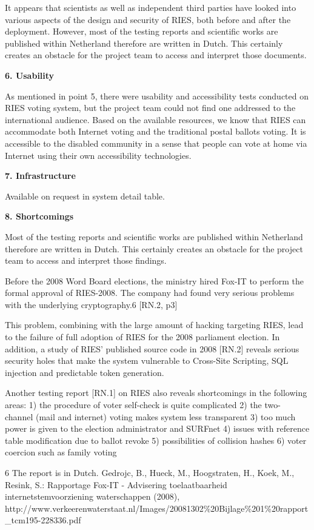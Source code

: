 It appears that scientists as well as independent third parties have looked into various aspects of the design and security of RIES, both before and after the deployment. However, most of the testing reports and scientific works are published within Netherland therefore are written in Dutch. This certainly creates an obstacle for the project team to access and interpret those documents.

\textbf{6. Usability}

As mentioned in point 5, there were usability and accessibility tests conducted on RIES voting system, but the project team could not find one addressed to the international audience. Based on the available resources, we know that RIES can accommodate both Internet voting and the traditional postal ballots voting. It is accessible to the disabled community in a sense that people can vote at home via Internet using their own accessibility technologies.

\textbf{7. Infrastructure}

Available on request in system detail table.

\textbf{8. Shortcomings}

Most of the testing reports and scientific works are published within Netherland therefore are written in Dutch. This certainly creates an obstacle for the project team to access and interpret those findings.

Before the 2008 Word Board elections, the ministry hired Fox-IT to perform the formal approval of RIES-2008. The company had found very serious problems with the underlying cryptography.6 [RN.2, p3]

This problem, combining with the large amount of hacking targeting RIES, lead to the failure of full adoption of RIES for the 2008 parliament election. In addition, a study of RIES' published source code in 2008 [RN.2] reveals serious security holes that make the system vulnerable to Cross-Site Scripting, SQL injection and predictable token generation.

Another testing report [RN.1] on RIES also reveals shortcomings in the following areas: 1) the procedure of voter self-check is quite complicated 2) the two- channel (mail and internet) voting makes system less transparent 3) too much power is given to the election administrator and SURFnet 4) issues with reference table modification due to ballot revoke 5) possibilities of collision hashes 6) voter coercion such as family voting

6 The report is in Dutch. Gedrojc, B., Hueck, M., Hoogstraten, H., Koek, M., Resink, S.: Rapportage Fox-IT - Advisering toelaatbaarheid internetstemvoorziening waterschappen (2008), http://www.verkeerenwaterstaat.nl/Images/20081302\%20Bijlage\%201\%20rapport\_tcm195-228336.pdf


